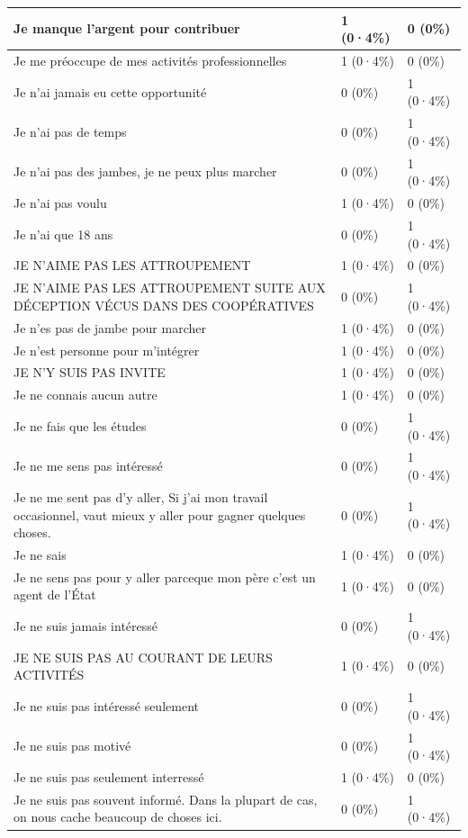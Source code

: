 \documentclass[
]{book}
\begin{document}
\begin{tabular}{l|l|l}
\hline
Je manque l'argent pour contribuer & 1 (0·4\%) & 0 (0\%)\\
\hline
Je me préoccupe de mes activités professionnelles & 1 (0·4\%) & 0 (0\%)\\
\hline
Je n'ai jamais eu cette opportunité & 0 (0\%) & 1 (0·4\%)\\
\hline
Je n'ai pas de temps & 0 (0\%) & 1 (0·4\%)\\
\hline
Je n'ai pas des jambes, je ne peux plus marcher & 0 (0\%) & 1 (0·4\%)\\
\hline
Je n'ai pas voulu & 1 (0·4\%) & 0 (0\%)\\
\hline
Je n'ai que 18 ans & 0 (0\%) & 1 (0·4\%)\\
\hline
JE N'AIME PAS LES ATTROUPEMENT & 1 (0·4\%) & 0 (0\%)\\
\hline
JE N'AIME PAS LES ATTROUPEMENT SUITE AUX DÉCEPTION VÉCUS DANS DES COOPÉRATIVES & 0 (0\%) & 1 (0·4\%)\\
\hline
Je n'es pas de jambe pour marcher & 1 (0·4\%) & 0 (0\%)\\
\hline
Je n'est personne pour m'intégrer & 1 (0·4\%) & 0 (0\%)\\
\hline
JE N'Y SUIS PAS INVITE & 1 (0·4\%) & 0 (0\%)\\
\hline
Je ne connais aucun autre & 1 (0·4\%) & 0 (0\%)\\
\hline
Je ne fais que les études & 0 (0\%) & 1 (0·4\%)\\
\hline
Je ne me sens pas intéressé & 0 (0\%) & 1 (0·4\%)\\
\hline
Je ne me sent pas d'y aller,
Si j'ai mon travail occasionnel, vaut mieux y aller pour gagner quelques choses. & 0 (0\%) & 1 (0·4\%)\\
\hline
Je ne sais & 1 (0·4\%) & 0 (0\%)\\
\hline
Je ne sens pas pour y aller parceque mon père c'est un agent de l'État & 1 (0·4\%) & 0 (0\%)\\
\hline
Je ne suis jamais intéressé & 0 (0\%) & 1 (0·4\%)\\
\hline
JE NE SUIS PAS AU COURANT DE LEURS ACTIVITÉS & 1 (0·4\%) & 0 (0\%)\\
\hline
Je ne suis pas intéressé seulement & 0 (0\%) & 1 (0·4\%)\\
\hline
Je ne suis pas motivé & 0 (0\%) & 1 (0·4\%)\\
\hline
Je ne suis pas seulement interressé & 1 (0·4\%) & 0 (0\%)\\
\hline
Je ne suis pas souvent informé. Dans la plupart de cas, on nous cache beaucoup de choses ici. & 0 (0\%) & 1 (0·4\%)\\

\end{tabular}
\end{document}
